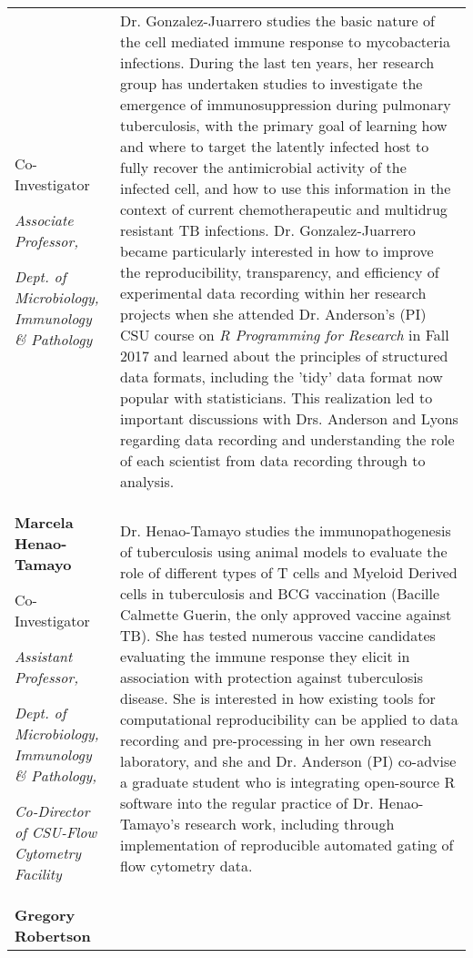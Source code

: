 \begin{table}[!h]
{\begin{tabular}[t]{>{\raggedright\arraybackslash}p{14em}>{\raggedright\arraybackslash}p{45em}}
  Co-Investigator
  
  \textit{Associate Professor,}
  
  \textit{Dept. of Microbiology, Immunology \& Pathology} & Dr. Gonzalez-Juarrero studies the basic nature of the
  cell mediated immune response to mycobacteria infections. During the last ten
  years, her research group has undertaken studies to investigate the emergence of
  immunosuppression during pulmonary tuberculosis, with the primary goal of
  learning how and where to target the latently infected host to fully recover the
  antimicrobial activity of the infected cell, and how to use this information in
  the context of current chemotherapeutic and multidrug resistant TB infections.
  Dr. Gonzalez-Juarrero became particularly interested in how to improve the
  reproducibility, transparency, and efficiency of experimental data recording
  within her research projects when she attended Dr. Anderson's (PI) CSU course on
  \textit{R Programming for Research} in Fall 2017 and learned about the
  principles of structured data formats, including the 'tidy' data format now
  popular with statisticians. This realization led to important discussions with
  Drs. Anderson and Lyons regarding data recording and understanding the role of
  each scientist from data recording through to analysis.\\
\textbf{Marcela Henao-Tamayo}
  
  Co-Investigator
  
  \textit{Assistant Professor,}
  
  \textit{Dept. of Microbiology, Immunology \& Pathology,}
  
  \textit{Co-Director of CSU-Flow Cytometry Facility} & Dr. Henao-Tamayo studies the immunopathogenesis of
  tuberculosis using animal models to evaluate the role of different types of T
  cells and Myeloid Derived cells in tuberculosis and BCG vaccination (Bacille
  Calmette Guerin, the only approved vaccine against TB). She has tested numerous
  vaccine candidates evaluating the immune response they elicit in association
  with protection against tuberculosis disease. She is interested in how existing
  tools for computational reproducibility can be applied to data recording and
  pre-processing in her own research laboratory, and she and Dr. Anderson (PI)
  co-advise a graduate student who is integrating open-source R software into the
  regular practice of Dr. Henao-Tamayo's research work, including through
  implementation of reproducible automated gating of flow cytometry data.\\
\textbf{Gregory Robertson}
  

\end{tabular}}
\end{table}
